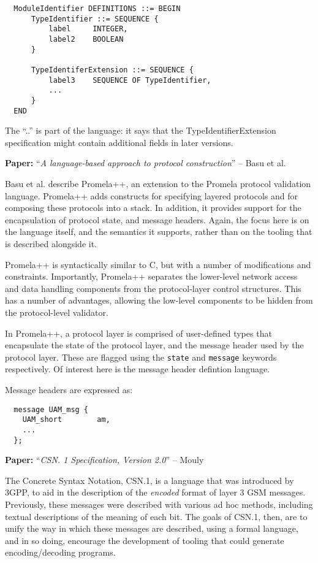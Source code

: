 \documentclass[10pt]{article}
\newcommand{\paper}[3]{\vspace{4mm}\noindent\textbf{Paper:} ``\textit{#1}'' -- #2 \cite{#3}\vspace{3mm}}
\begin{document}
\begin{verbatim}
  ModuleIdentifier DEFINITIONS ::= BEGIN
      TypeIdentifier ::= SEQUENCE {
          label     INTEGER,
          label2    BOOLEAN
      }
    
      TypeIdentiferExtension ::= SEQUENCE {
          label3    SEQUENCE OF TypeIdentifier,
          ...
      }
  END
\end{verbatim}

The ``..'' is part of the language: it says that the TypeIdentifierExtension specification
might contain additional fields in later versions.

\paper{A language-based approach to protocol construction}{Basu et al.}{basu1997language}

Basu et al. describe Promela++, an extension to the Promela protocol validation language.
Promela++ adds constructs for specifying layered protocols and for composing these
protocols into a stack. In addition, it provides support for the encapsulation of
protocol state, and message headers. Again, the focus here is on the language itself, and
the semantics it supports, rather than on the tooling that is described alongside it.

Promela++ is syntactically similar to C, but with a number of modifications and
constraints. Importantly, Promela++ separates the lower-level network access and data
handling components from the protocol-layer control structures. This has a number of
advantages, allowing the low-level components to be hidden from the protocol-level
validator.

In Promela++, a protocol layer is comprised of user-defined types that encapsulate the
state of the protocol layer, and the message header used by the protocol layer. These
are flagged using the \texttt{state} and \texttt{message} keywords respectively. Of 
interest here is the message header defintion language.

Message headers are expressed as:

\begin{verbatim}
  message UAM_msg {
    UAM_short        am,
    ...
  };
\end{verbatim}

\paper{CSN. 1 Specification, Version 2.0}{Mouly}{mouly1998csn}

The Concrete Syntax Notation, CSN.1, is a language that was introduced by 3GPP, to aid in
the description of the \emph{encoded} format of layer 3 GSM messages. Previously, these
messages were described with various ad hoc methods, including textual descriptions of the
meaning of each bit. The goals of CSN.1, then, are to unify the way in which these
messages are described, using a formal language, and in so doing, encourage the
development of tooling that could generate encoding/decoding programs.
\end{document}
